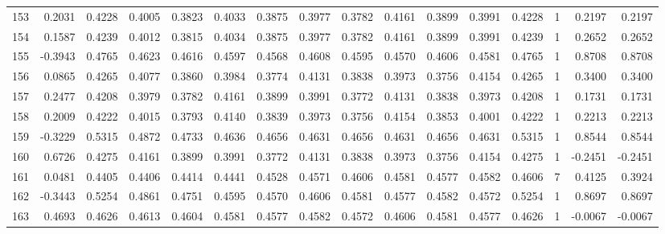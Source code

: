 \begin{tabular}{lrrrrrrrrrrrrrrr}
153 &      0.2031 &  0.4228 &  0.4005 &  0.3823 &  0.4033 &  0.3875 &  0.3977 &  0.3782 &  0.4161 &  0.3899 &   0.3991 &     0.4228 &      1 &                    0.2197 &                     0.2197 \\
154 &      0.1587 &  0.4239 &  0.4012 &  0.3815 &  0.4034 &  0.3875 &  0.3977 &  0.3782 &  0.4161 &  0.3899 &   0.3991 &     0.4239 &      1 &                    0.2652 &                     0.2652 \\
155 &     -0.3943 &  0.4765 &  0.4623 &  0.4616 &  0.4597 &  0.4568 &  0.4608 &  0.4595 &  0.4570 &  0.4606 &   0.4581 &     0.4765 &      1 &                    0.8708 &                     0.8708 \\
156 &      0.0865 &  0.4265 &  0.4077 &  0.3860 &  0.3984 &  0.3774 &  0.4131 &  0.3838 &  0.3973 &  0.3756 &   0.4154 &     0.4265 &      1 &                    0.3400 &                     0.3400 \\
157 &      0.2477 &  0.4208 &  0.3979 &  0.3782 &  0.4161 &  0.3899 &  0.3991 &  0.3772 &  0.4131 &  0.3838 &   0.3973 &     0.4208 &      1 &                    0.1731 &                     0.1731 \\
158 &      0.2009 &  0.4222 &  0.4015 &  0.3793 &  0.4140 &  0.3839 &  0.3973 &  0.3756 &  0.4154 &  0.3853 &   0.4001 &     0.4222 &      1 &                    0.2213 &                     0.2213 \\
159 &     -0.3229 &  0.5315 &  0.4872 &  0.4733 &  0.4636 &  0.4656 &  0.4631 &  0.4656 &  0.4631 &  0.4656 &   0.4631 &     0.5315 &      1 &                    0.8544 &                     0.8544 \\
160 &      0.6726 &  0.4275 &  0.4161 &  0.3899 &  0.3991 &  0.3772 &  0.4131 &  0.3838 &  0.3973 &  0.3756 &   0.4154 &     0.4275 &      1 &                   -0.2451 &                    -0.2451 \\
161 &      0.0481 &  0.4405 &  0.4406 &  0.4414 &  0.4441 &  0.4528 &  0.4571 &  0.4606 &  0.4581 &  0.4577 &   0.4582 &     0.4606 &      7 &                    0.4125 &                     0.3924 \\
162 &     -0.3443 &  0.5254 &  0.4861 &  0.4751 &  0.4595 &  0.4570 &  0.4606 &  0.4581 &  0.4577 &  0.4582 &   0.4572 &     0.5254 &      1 &                    0.8697 &                     0.8697 \\
163 &      0.4693 &  0.4626 &  0.4613 &  0.4604 &  0.4581 &  0.4577 &  0.4582 &  0.4572 &  0.4606 &  0.4581 &   0.4577 &     0.4626 &      1 &                   -0.0067 &                    -0.0067 \\

\end{tabular}
